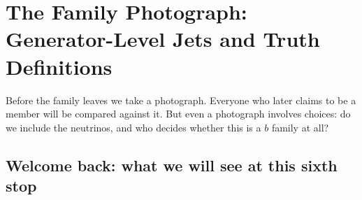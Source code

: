 \providecommand{\Bbar}{\ensuremath{\bar B^0}\xspace}
\providecommand{\Bz}{\ensuremath{B^0}\xspace}
\providecommand{\Lbbar}{\ensuremath{\bar\Lambda_b^0}\xspace}
\providecommand{\akfour}{\code{ak4GenJets}\xspace}
\providecommand{\akfournonu}{\code{ak4GenJetsNoNu}\xspace}
\providecommand{\akeight}{\code{ak8GenJets}\xspace}
\providecommand{\hadflav}{\code{hadronFlavour}\xspace}
\providecommand{\partflav}{\code{partonFlavour}\xspace}
\providecommand{\dij}{\ensuremath{d_{ij}}\xspace}
\providecommand{\diB}{\ensuremath{d_{iB}}\xspace}
\providecommand{\uik}{\ensuremath{u_{ik}}\xspace}
\chapter{The Family Photograph: Generator-Level Jets and Truth Definitions}
\label{ch:family_photograph}

\begin{journeybox}
Before the family leaves we take a photograph. Everyone who later claims to be a
member will be compared against it. But even a photograph involves choices: do
we include the neutrinos, and who decides whether this is a $b$ family at all?
\end{journeybox}


\section{Welcome back: what we will see at this sixth stop}
\label{sec:family_photograph:what_we_compute}

